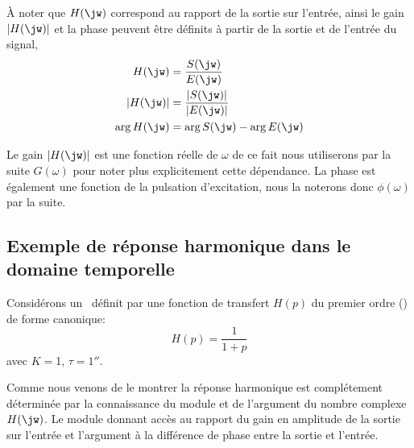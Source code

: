 \`A noter que $H(\jw)$ correspond au rapport de la sortie sur l'entrée,
ainsi le gain $|H(\jw)|$ et la phase peuvent être définits à partir de la sortie et de l'entrée du signal,
\begin{align*}
    H(\jw) &= \dfrac{S(\jw)}{E(\jw)} \\
    |H(\jw)|&= \dfrac{|S(\jw)|}{|E(\jw)|} \\
    \arg{H(\jw)}&=\arg{S(\jw)}-\arg{E(\jw)}
\end{align*}

Le gain $|H(\jw)|$ est une fonction réelle de $\omega$ de ce fait nous utiliserons par la suite
$G(\omega)$ pour noter plus explicitement cette dépendance. La phase est également
une fonction de la pulsation d'excitation, nous la noterons donc $\phi(\omega)$ par la suite.


\subsection{Exemple de réponse harmonique dans le domaine temporelle}
Considérons un \SLCI~définit par une fonction de transfert $H(p)$ du premier ordre () de forme canonique:
$$
H(p)=\dfrac{1}{1+p}
$$
avec $K=$1, $\tau=\unit{1}{\second}$.

Comme nous venons de le montrer la réponse harmonique est complétement 
déterminée par la connaissance du module et de l'argument du nombre complexe $H(\jw)$.
Le module donnant accès au rapport du gain en amplitude de la sortie sur l'entrée et 
l'argument à la différence de phase entre la sortie et l'entrée.

